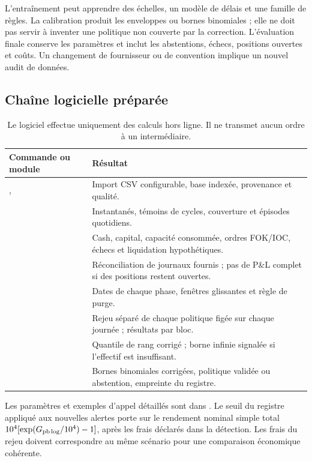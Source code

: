 L'entraînement peut apprendre des échelles, un modèle de délais et une famille de règles. La calibration produit les enveloppes ou bornes binomiales ; elle ne doit pas servir à inventer une politique non couverte par la correction. L'évaluation finale conserve les paramètres et inclut les abstentions, échecs, positions ouvertes et coûts. Un changement de fournisseur ou de convention implique un nouvel audit de données.

\subsection{Chaîne logicielle préparée}

\begin{table}[H]\centering\small
\begin{tabularx}{\linewidth}{@{}p{40mm}Y@{}}
\toprule
Commande ou module & Résultat\\
\midrule
{},  & Import CSV configurable, base indexée, provenance et qualité.\\
 & Instantanés, témoins de cycles, couverture et épisodes quotidiens.\\
 & Cash, capital, capacité consommée, ordres FOK/IOC, échecs et liquidation hypothétiques.\\
 & Réconciliation de journaux fournis ; pas de P\&L complet si des positions restent ouvertes.\\
 & Dates de chaque phase, fenêtres glissantes et règle de purge.\\
 & Rejeu séparé de chaque politique figée sur chaque journée ; résultats par bloc.\\
 & Quantile de rang corrigé ; borne infinie signalée si l'effectif est insuffisant.\\
 & Bornes binomiales corrigées, politique validée ou abstention, empreinte du registre.\\
\bottomrule
\end{tabularx}
\caption{Le logiciel effectue uniquement des calculs hors ligne. Il ne transmet aucun ordre à un intermédiaire.}
\end{table}

Les paramètres et exemples d'appel détaillés sont dans . Le seuil du registre appliqué aux nouvelles alertes porte sur le rendement nominal simple total \(10^4[\exp(G_{\rm pb\,log}/10^4)-1]\), après les frais déclarés dans la détection. Les frais du rejeu doivent correspondre au même scénario pour une comparaison économique cohérente.

